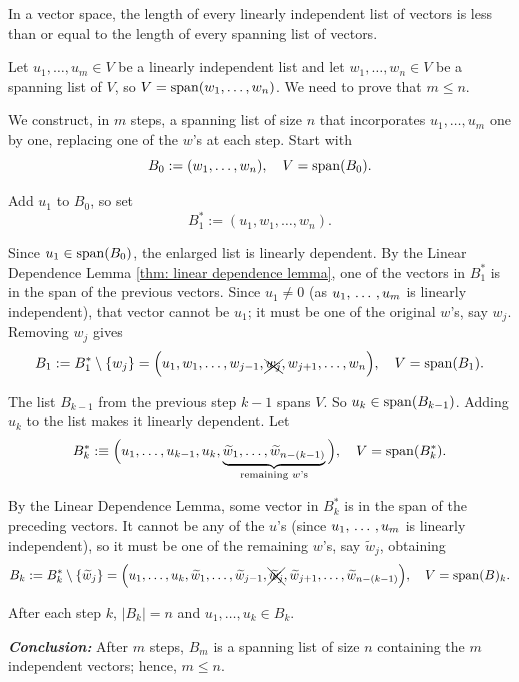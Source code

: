 \setcounter{thm}{21}
\begin{thm} 
  \label{thm: length of linearly independent list at most length of spanning list}
  In a \fd vector space, the length of every linearly independent list of vectors is less than or equal to the length of every spanning list of vectors.
\end{thm}
\begin{prf}
  Let $u_1, \ldots, u_m \in V$ be a linearly independent list and let $w_1, \ldots, w_n \in V$ be a spanning list of $V$, so $V = \operatorname{span} (w_1, \ldots, w_n)$.
  We need to prove that $m \leq n$.
  
  We construct, in $m$ steps, a spanning list of size $n$ that incorporates $u_1,\dots,u_m$ one by one, replacing one of the $w$'s at each step.
  Start with
  \[
      B_0 := (w_1, \dots, w_n), \quad V = \operatorname{span} (B_0).
  \]

   Add $u_1$ to $B_0$, so set
  \begin{equation}
    B_1^* := (u_1, w_1, \ldots, w_n).
  \end{equation}

  Since $u_1 \in \operatorname{span} (B_0)$, the enlarged list is linearly dependent. By the Linear Dependence Lemma \ref{thm: linear dependence lemma}, one of the vectors in $B_1^*$ is in the span of the previous vectors. Since $u_1 \neq 0$ (as $u_1, {\, \ldots \,\,}, u_m$ is linearly independent), that vector cannot be $u_1$; it must be one of the original $w$'s, say $w_j$. Removing $w_j$ gives
  \begin{equation*}
    B_1 := B_1^* \setminus \{w_j\} = \Big(u_1, w_1, \ldots, w_{j-1}, \xcancel{w_j}, w_{j+1}, \ldots, w_n\Big), \quad V=\operatorname{span} (B_1).
  \end{equation*}

   The list $B_{k-1}$ from the previous step $k-1$ spans $V$. So $u_{k} \in \operatorname{span} (B_{k-1})$. Adding $u_k$ to the list makes it linearly dependent. Let
  \begin{equation*}
    B_k^* :\equiv \Big(u_1, \ldots, u_{k-1}, u_k, \underbrace{\widetilde w_{1}, \ldots, \widetilde w_{n-(k-1)} }_{\text{remaining $w$'s}} \Big), \quad V=\operatorname{span} (B_k^*).
  \end{equation*}

  By the Linear Dependence Lemma, some vector in $B_k^*$ is in the span of the preceding vectors. It cannot be any of the $u$'s (since $u_1, {\, \ldots \,\,}, u_m$ is linearly independent), so it must be one of the remaining $w$'s, say $\widetilde w_j$, obtaining
  \begin{equation*}
    B_k := B_k^* \setminus \{\widetilde w_j \} = \Big(u_1, \ldots, u_{k}, \widetilde w_1, \ldots, \widetilde w_{j-1}, \xcancel{\widetilde w_j}, \widetilde w_{j+1}, \ldots, \widetilde w_{n-(k-1)}\Big), \quad V=\operatorname{span} (B)_k.
  \end{equation*}

  After each step $k$, $|B_k| = n$ and $u_1,\dots,u_k\in B_k$.

  \emph{\bfseries Conclusion:} After $m$ steps, $B_m$ is a spanning list of size $n$ containing the $m$ independent vectors; hence, $m \leq n$.
\end{prf}

